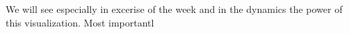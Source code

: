 We will see especially in excerise of the week and in the dynamics the power of this visualization. Most importantl